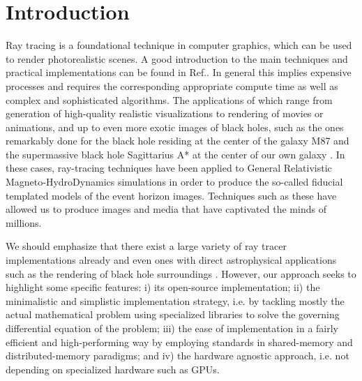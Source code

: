 
\section{Introduction}
\label{sec:intro}


Ray tracing is a foundational technique in computer graphics, which can be used
to render photorealistic scenes.
A good introduction to the main techniques and practical implementations can be found
in Ref.\cite{raytracing_in_one_weekend}.
In general this implies expensive processes and requires the corresponding appropriate compute time
as well as complex and sophisticated algorithms.
The applications \cite{Peddie2019_appns} of which range from generation of high-quality realistic visualizations to
rendering of movies or animations, and up to even more exotic images of black holes,
such as the ones remarkably done for the black hole residing at the center of the galaxy M87 \cite{M87_EHT_i}
and the supermassive black hole Sagittarius A* at the center of our own galaxy \cite{SagA_EHT_i}.
In these cases, ray-tracing techniques have been applied to
General Relativistic Magneto-HydroDynamics simulations in order to produce 
the so-called fiducial templated models of the event horizon images.
Techniques such as these have allowed us to produce images and media that have captivated the minds of millions.

We should emphasize that there exist a large variety of ray tracer implementations already 
\cite{imbens2023graphicalprocessinggeodesicpropagation,10.2312/EGPGV/EGPGV12/051-060,7539599_OSPRay}
and even ones with direct astrophysical applications such as the rendering of black hole surroundings
\cite{10.2312:vmv.20221208,sharma2023mahakalapythonbasedmodularraytracing,James_2015}.
However, our approach seeks to highlight some specific features:
i) its open-source implementation;
ii) the minimalistic and simplistic implementation strategy, i.e. by tackling
mostly the actual mathematical problem using specialized libraries
to solve the governing differential equation of the problem;
iii) the ease of implementation in a fairly efficient and high-performing
way by employing standards in shared-memory and distributed-memory paradigms;
and iv) the hardware agnostic approach, i.e. not depending on specialized hardware such as GPUs.\cite{Peddie2019_hardware}

